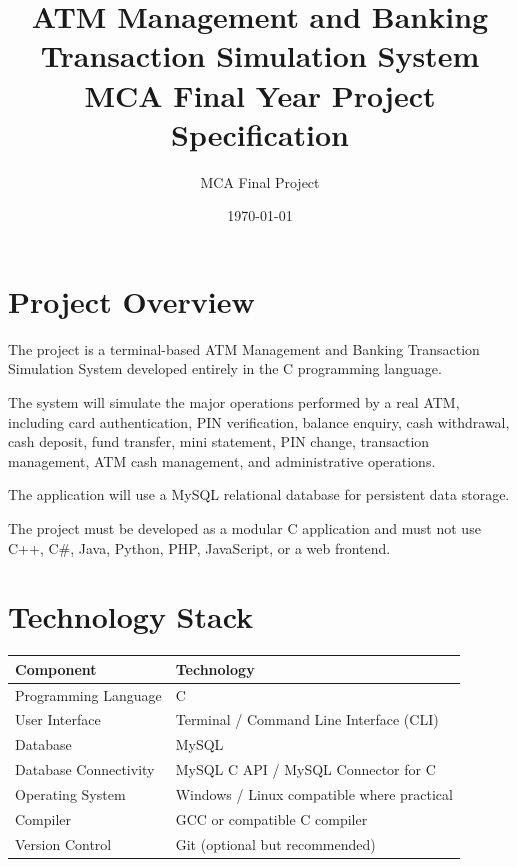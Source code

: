 \documentclass[12pt,a4paper]{article}
\title{
    \textbf{ATM Management and Banking Transaction Simulation System}\\
    \large MCA Final Year Project Specification
}
\author{MCA Final Project}
\date{\today}
\begin{document}
\maketitle

\tableofcontents
\newpage


\section{Project Overview}

The project is a terminal-based ATM Management and Banking Transaction
Simulation System developed entirely in the C programming language.

The system will simulate the major operations performed by a real ATM,
including card authentication, PIN verification, balance enquiry, cash
withdrawal, cash deposit, fund transfer, mini statement, PIN change,
transaction management, ATM cash management, and administrative operations.

The application will use a MySQL relational database for persistent data
storage.

The project must be developed as a modular C application and must not use
C++, C\#, Java, Python, PHP, JavaScript, or a web frontend.


\section{Technology Stack}

\begin{longtable}{p{} p{}}
\toprule
\textbf{Component} & \textbf{Technology} \\
\midrule
Programming Language & C \\
User Interface & Terminal / Command Line Interface (CLI) \\
Database & MySQL \\
Database Connectivity & MySQL C API / MySQL Connector for C \\
Operating System & Windows / Linux compatible where practical \\
Compiler & GCC or compatible C compiler \\
Version Control & Git (optional but recommended) \\
\bottomrule
\end{longtable}
\end{document}
